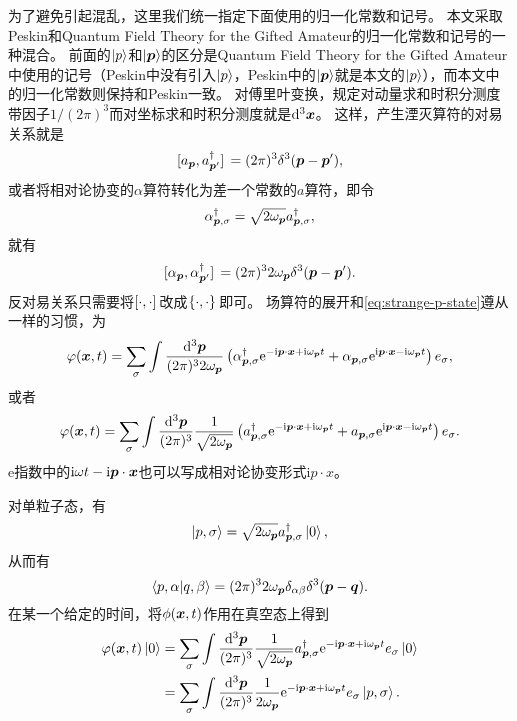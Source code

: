 \documentclass[hyperref, UTF8, a4paper]{ctexart}
\newcommand*{\ii}{\mathrm{i}}
\newcommand*{\ee}{\mathrm{e}}
\begin{document}
为了避免引起混乱，这里我们统一指定下面使用的归一化常数和记号。
本文采取Peskin和Quantum Field Theory for the Gifted Amateur的归一化常数和记号的一种混合。
前面的$\ket{p}$和$\ket{\vb*{p}}$的区分是Quantum Field Theory for the Gifted Amateur中使用的记号（Peskin中没有引入$\ket{p}$，Peskin中的$\ket{\vb*{p}}$就是本文的$\ket{p}$），而本文中的归一化常数则保持和Peskin一致。
对傅里叶变换，规定对动量求和时积分测度带因子$1/(2\pi)^3$而对坐标求和时积分测度就是$\dd[3]{\vb*{x}}$。
这样，产生湮灭算符的对易关系就是
\begin{equation}
    \comm*{{a}_{\vb*{p}}}{{a}^\dagger_{\vb*{p}'}} = (2\pi)^3 \delta^3 (\vb*{p} - \vb*{p}'),
\end{equation}
或者将相对论协变的$\alpha$算符转化为差一个常数的$a$算符，即令
\begin{equation}
    \alpha^\dagger_{\vb*{p}, \sigma} = \sqrt{2 \omega_{\vb*{p}}} a^\dagger_{\vb*{p}, \sigma},
\end{equation}
就有
\begin{equation}
    \comm*{{\alpha}_{\vb*{p}}}{{\alpha}^\dagger_{\vb*{p}'}} = (2\pi)^3 2 \omega_{\vb*{p}} \delta^3 (\vb*{p} - \vb*{p}').
\end{equation}
反对易关系只需要将$\comm*{\cdot}{\cdot}$改成$\acomm*{\cdot}{\cdot}$即可。
场算符的展开和\eqref{eq:strange-p-state}遵从一样的习惯，为
\begin{equation}
    \varphi(\vb*{x}, t) = \sum_{\sigma} \int \frac{\dd[3]{\vb*{p}}}{(2\pi)^3 2 \omega_{\vb*{p}}} \left( {\alpha}^\dagger_{\vb*{p}, \sigma} \ee^{- \ii \vb*{p} \cdot \vb*{x} + \ii \omega_{\vb*{p}} t} + {\alpha}_{\vb*{p}, \sigma} \ee^{\ii \vb*{p} \cdot \vb*{x} - \ii \omega_{\vb*{p}} t} \right) e_\sigma,
\end{equation}
或者
\begin{equation}
    {\varphi}(\vb*{x}, t) = \sum_\sigma \int \frac{\dd[3]{\vb*{p}}}{(2\pi)^3} \frac{1}{\sqrt{2 \omega_{\vb*{p}}}} \left( {a}^\dagger_{\vb*{p}, \sigma} \ee^{- \ii \vb*{p} \cdot \vb*{x} + \ii \omega_{\vb*{p}} t} + {a}_{\vb*{p}, \sigma} \ee^{\ii \vb*{p} \cdot \vb*{x} - \ii \omega_{\vb*{p}} t} \right) e_\sigma. 
    \label{eq:field-operator-fourier}
\end{equation}
$\ee$指数中的$\ii \omega t - \ii \vb*{p} \cdot \vb*{x}$也可以写成相对论协变形式$\ii p \cdot x$。

对单粒子态，有
\[
    \ket{p, \sigma} = \sqrt{2 \omega_{\vb*{p}}} {a}^\dagger_{\vb*{p}, \sigma} \ket{0},
\]
从而有
\begin{equation}
    \braket{p, \alpha}{q, \beta} = (2\pi)^3 2 \omega_{\vb*{p}} \delta_{\alpha \beta} \delta^3(\vb*{p} - \vb*{q}).
\end{equation}
在某一个给定的时间，将${\phi}(\vb*{x}, t)$作用在真空态上得到
\[
    \begin{aligned}
        {\varphi}(\vb*{x}, t) \ket{0} &= \sum_\sigma \int \frac{\dd[3]{\vb*{p}}}{(2\pi)^3} \frac{1}{\sqrt{2 \omega_{\vb*{p}}}} {a}^\dagger_{\vb*{p}, \sigma} \ee^{- \ii \vb*{p} \cdot \vb*{x} + \ii \omega_{\vb*{p}} t} e_{\sigma} \ket{0} \\
        &= \sum_\sigma \int \frac{\dd[3]{\vb*{p}}}{(2\pi)^3} \frac{1}{2 \omega_{\vb*{p}}} \ee^{- \ii \vb*{p} \cdot \vb*{x} + \ii \omega_{\vb*{p}} t} e_{\sigma} \ket{p, \sigma}.
    \end{aligned}
\]
\end{document}
